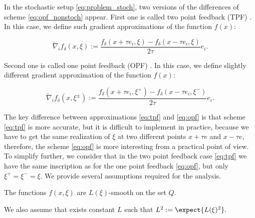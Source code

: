         In the stochastic setup \eqref{eq:problem_stoch}, two versions of the differences of scheme \eqref{eq:opf_nonstoch} appear. First one is called two point feedback (TPF) \cite{duchi2015optimal, shamir2017optimal, doi:10.1137/19M1259225, beznosikov2020gradient, gasnikov2022power}. In this case, we define such gradient approximations of the function $f(x)$:

        \begin{equation}\label{eq:tpf}
            \widetilde{\nabla}_if_\delta(x, \xi) :=  \dfrac{f_\delta(x + \tau e_i, \xi) - f_\delta(x - \tau e_i, \xi)}{2 \tau} e_i .
        \end{equation}


        Second one is called one point feedback (OPF) \cite{nemirovskij1983problem, flaxman2004online, gasnikov2017stochastic, akhavan2020exploiting, beznosikov2021one}. In this case, we define slightly different gradient approximation of the function $f(x)$: 
        

        \begin{equation}\label{eq:opf}
            \widetilde{\nabla}_if_\delta(x, \xi^{\pm}) :=  \dfrac{f_\delta(x + \tau e_i, \xi^+) - f_\delta(x - \tau e_i, \xi^-)}{2 \tau} e_i .
        \end{equation}
        

        The key difference between approximations \eqref{eq:tpf} and \eqref{eq:opf} is that scheme \eqref{eq:tpf} is more accurate, but it is difficult to implement in practice, because we have to get the same realization of $\xi$ at two different points $x + \tau e$ and $x - \tau e$, therefore, the scheme \eqref{eq:opf} is more interesting from a practical point of view. To simplify further, we consider that in the two point feedback case \eqref{eq:tpf} we have the same inscription as for the one point feedback \eqref{eq:opf}, but only $\xi^+ = \xi^- = \xi$.
        We provide several assumptions required for the analysis.
    
        \begin{assumption}[Smoothness]\label{ass:smooth}
            The functions $f(x, \xi)$ are $L(\xi)$-smooth on the set $Q$.
            
            We also assume that exists constant $L$ such that 
            $
                L^2 := \expect{L(\xi)^2}.
            $
        \end{assumption}

